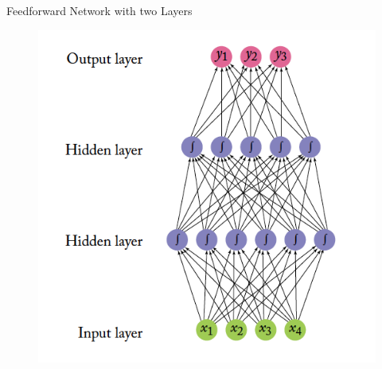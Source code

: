 \documentclass[handout]{beamer}
\begin{document}
\begin{frame}{Feedforward Network with two Layers}


\begin{figure}[htb]
	\centering
	 \includegraphics[scale=0.38]{pics/NN-example.png}
\end{figure}


\end{frame}
\end{document}
